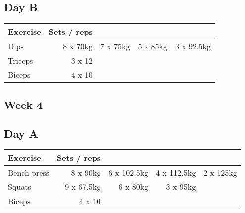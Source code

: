 \documentclass[12pt, a4paper]{article}%
\begin{document}
  \subsection*{\hspace{0.5em} Day B }


  \begin{tabular}{l|rrrr}
  \hspace{0.75em} \textbf{Exercise} & \textbf{Sets / reps} \\ \hline

            \hspace{0.75em} Dips
            & 8 x 70kg
            & 7 x 75kg
            & 5 x 85kg
            & 3 x 92.5kg
            \\


   \hspace{0.75em} Triceps & 3 x 12 \\
   \hspace{0.75em} Biceps & 4 x 10 \\
  \end{tabular}

 \subsection*{\hspace{0.25em} Week 4 }
  \subsection*{\hspace{0.5em} Day A }


  \begin{tabular}{l|rrrr}
  \hspace{0.75em} \textbf{Exercise} & \textbf{Sets / reps} \\ \hline

            \hspace{0.75em} Bench press
            & 8 x 90kg
            & 6 x 102.5kg
            & 4 x 112.5kg
            & 2 x 125kg
            \\


            \hspace{0.75em} Squats
            & 9 x 67.5kg
            & 6 x 80kg
            & 3 x 95kg
            & 
            \\


   \hspace{0.75em} Biceps & 4 x 10 \\
  \end{tabular}
\end{document}
